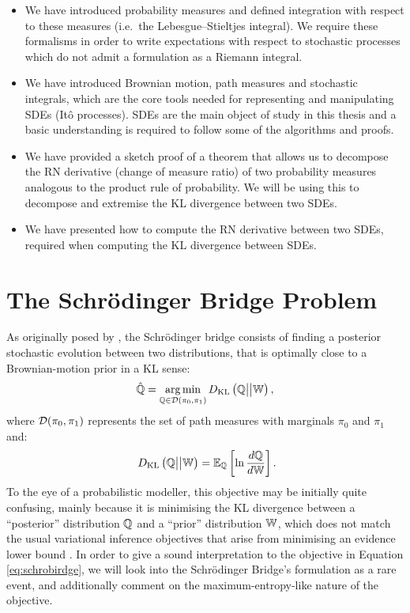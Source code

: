 \documentclass[a4paper,12pt,twoside,openright]{report}
\theoremstyle{definition}
\begin{document}
\begin{itemize}
    \item We have introduced probability measures and defined integration with respect to these measures (i.e.\ the Lebesgue–Stieltjes integral). We require these formalisms in order to write expectations with respect to stochastic processes which do not admit a formulation as a Riemann integral.
    \item We have introduced Brownian motion, path measures and stochastic integrals, which are the core tools needed for representing and manipulating SDEs (Itô processes). SDEs are the main object of study in this thesis and a basic understanding is required to follow some of the algorithms and proofs.
    \item We have provided a sketch proof of a theorem that allows us to decompose the RN derivative (change of measure ratio) of two probability measures analogous to the product rule of probability. We will be using this to decompose and extremise the KL divergence between two SDEs. 
    \item We have presented how to compute the RN derivative between two SDEs, required when computing the KL divergence between SDEs.
\end{itemize}
\chapter{The Schrödinger Bridge Problem}

As originally posed by \citet{schrodinger1931uber, schrodinger1932theorie}, the Schrödinger bridge consists of finding a posterior stochastic evolution between two distributions, that is optimally close to a Brownian-motion prior in a KL sense:
\begin{align} \label{eq:schrobirdge}
    \hat{{\mathbb{Q}}}= \operatorname*{arg\,min}_{{\mathbb{Q}} \in {\mathcal{D}}(\pi_0, \pi_1)} D_{\mathrm{KL}}\left({\mathbb{Q}} \big|\big| \mathbb{W}\right),
\end{align}
where ${\mathcal{D}}(\pi_0, \pi_1)$ represents the set of path measures with marginals $\pi_0$ and $\pi_1$ and:
\begin{align} \label{eq:kl_sho}
    \ D_{\mathrm{KL}}\left({\mathbb{Q}} \big|\big| \mathbb{W}\right) = \mathbb{E}_{{\mathbb{Q}}}\left[\ln \frac{d{\mathbb{Q}}}{d\mathbb{W}}\right].
\end{align}
To the eye of a probabilistic modeller, this objective may be initially quite confusing, mainly because it is minimising the KL divergence between a ``posterior'' distribution ${\mathbb{Q}}$ and a ``prior'' distribution $\mathbb{W}$, which does not match the usual variational inference objectives that arise from minimising an evidence lower bound \citep{yang2017understanding}. In order to give a sound interpretation to the objective in Equation \ref{eq:schrobirdge}, we will look into the Schrödinger Bridge's formulation as a rare event, and additionally comment on the maximum-entropy-like nature of the objective.
\end{document}
